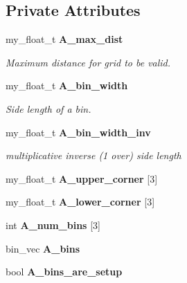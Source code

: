 \subsection*{Private Attributes}
\begin{CompactItemize}
\item 
my\_\-float\_\-t \bf{A\_\-max\_\-dist}\label{classSimSite3D_1_1geometry_1_1FaceBins_0481f2a87485d01a65aab4f8b687efca}

\begin{CompactList}\small\item\em Maximum distance for grid to be valid. \item\end{CompactList}\item 
my\_\-float\_\-t \bf{A\_\-bin\_\-width}\label{classSimSite3D_1_1geometry_1_1FaceBins_c3aa84da4207c9573aaef792e2988134}

\begin{CompactList}\small\item\em Side length of a bin. \item\end{CompactList}\item 
my\_\-float\_\-t \bf{A\_\-bin\_\-width\_\-inv}\label{classSimSite3D_1_1geometry_1_1FaceBins_4e1b856ab3efe9b683ed2a614be70271}

\begin{CompactList}\small\item\em multiplicative inverse (1 over) side length \item\end{CompactList}\item 
my\_\-float\_\-t \textbf{A\_\-upper\_\-corner} [3]\label{classSimSite3D_1_1geometry_1_1FaceBins_6858beab5909ad54778a973fa8079ad4}

\item 
my\_\-float\_\-t \textbf{A\_\-lower\_\-corner} [3]\label{classSimSite3D_1_1geometry_1_1FaceBins_5f44b49a5e0e0429df1d46ee850f40fc}

\item 
int \textbf{A\_\-num\_\-bins} [3]\label{classSimSite3D_1_1geometry_1_1FaceBins_71718aed789247b496f94743d98be593}

\item 
bin\_\-vec \textbf{A\_\-bins}\label{classSimSite3D_1_1geometry_1_1FaceBins_4155b182937c0d808db7b4719be36c29}

\item 
bool \textbf{A\_\-bins\_\-are\_\-setup}\label{classSimSite3D_1_1geometry_1_1FaceBins_8cd2197a8b71449917ef608aa8bedd11}

\end{CompactItemize}


